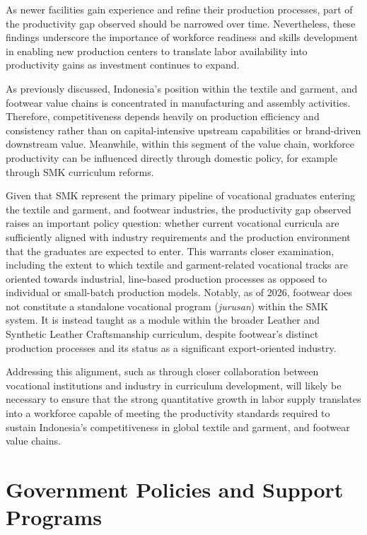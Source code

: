 \documentclass[
  manuscript=article,
  layout=publish,
  year=2026,
  volume=1,
]{den}
\begin{document}
As newer facilities gain experience and refine their production
processes, part of the productivity gap observed should be narrowed over
time. Nevertheless, these findings underscore the importance of
workforce readiness and skills development in enabling new production
centers to translate labor availability into productivity gains as
investment continues to expand.

As previously discussed, Indonesia's position within the textile and
garment, and footwear value chains is concentrated in manufacturing and
assembly activities. Therefore, competitiveness depends heavily on
production efficiency and consistency rather than on capital-intensive
upstream capabilities or brand-driven downstream value. Meanwhile,
within this segment of the value chain, workforce productivity can be
influenced directly through domestic policy, for example through SMK
curriculum reforms.

Given that SMK represent the primary pipeline of vocational graduates
entering the textile and garment, and footwear industries, the
productivity gap observed raises an important policy question: whether
current vocational curricula are sufficiently aligned with industry
requirements and the production environment that the graduates are
expected to enter. This warrants closer examination, including the
extent to which textile and garment-related vocational tracks are
oriented towards industrial, line-based production processes as opposed
to individual or small-batch production models. Notably, as of 2026,
footwear does not constitute a standalone vocational program
(\emph{jurusan}) within the SMK system. It is instead taught as a module
within the broader Leather and Synthetic Leather Craftsmanship
curriculum, despite footwear's distinct production processes and its
status as a significant export-oriented industry.

Addressing this alignment, such as through closer collaboration between
vocational institutions and industry in curriculum development, will
likely be necessary to ensure that the strong quantitative growth in
labor supply translates into a workforce capable of meeting the
productivity standards required to sustain Indonesia's competitiveness
in global textile and garment, and footwear value chains.

\section{Government Policies and Support
Programs}\label{government-policies-and-support-programs}
\end{document}
